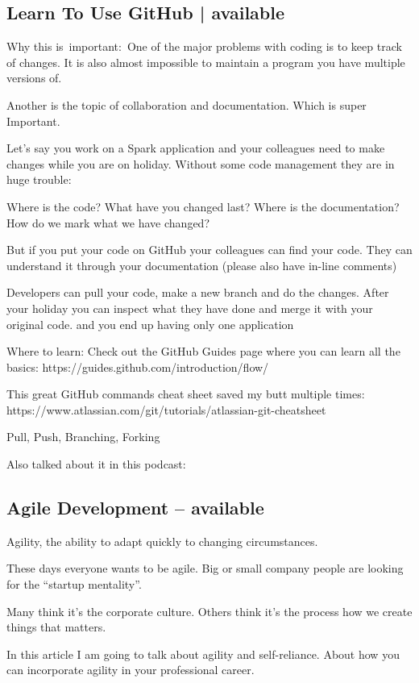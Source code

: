 \documentclass[12pt]{scrartcl} %
\begin{document}
\subsection{Learn To Use GitHub | available}
Why this is important: One of the major problems with coding is to keep track of changes. It is also almost impossible to maintain a program you have multiple versions of.

Another is the topic of collaboration and documentation. Which is super Important.

Let’s say you work on a Spark application and your colleagues need to make changes while you are on holiday. Without some code management they are in huge trouble:

Where is the code? What have you changed last? Where is the documentation? How do we mark what we have changed?

But if you put your code on GitHub your colleagues can find your code. They can understand it through your documentation (please also have in-line comments)

Developers can pull your code, make a new branch and do the changes. After your holiday you can inspect what they have done and merge it with your original code. and you end up having only one application

Where to learn:
Check out the GitHub Guides page where you can learn all the basics: https://guides.github.com/introduction/flow/

This great GitHub commands cheat sheet saved my butt multiple times: https://www.atlassian.com/git/tutorials/atlassian-git-cheatsheet

Pull, Push, Branching, Forking

Also talked about it in this podcast:

\subsection{Agile Development  -- available}
Agility, the ability to adapt quickly to changing circumstances.

These days everyone wants to be agile. Big or small company people are looking for the “startup mentality”.

Many think it’s the corporate culture. Others think it’s the process how we create things that matters.

In this article I am going to talk about agility and self-reliance. About how you can incorporate agility in your professional career.
\end{document}
